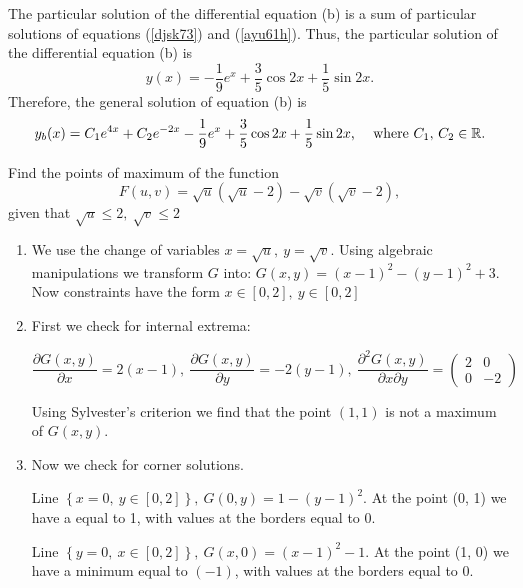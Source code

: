 \documentclass[addpoints, answers]{exam} %
\begin{document}
\begin{questions}
\begin{parts}
\begin{solution}
  The particular solution of the differential equation (b) is a sum of particular solutions of equations (\ref{djsk73}) and (\ref{ayu61h}). Thus, the particular solution of the differential equation (b) is
  \[
      y(x) = -\frac{1}{9} e^x + \frac{3}{5} \cos 2x + \frac{1}{5} \sin 2x \text{.}
  \]
  Therefore, the general solution of equation (b) is
  \[
      y_b(x) = {C_1}{e^{4x}} + {C_2}{e^{ - 2x}} -\frac{1}{9} e^x + \frac{3}{5} \cos 2x + \frac{1}{5} \sin 2x \text{, \quad where $C_1, \, C_2 \in \mathbb{R}$.}
  \]
\end{solution}


\end{parts}





\question[10] Find the points of maximum of the function
\[
F\left(u,v\right)=\sqrt{u}\left(\sqrt{u}-2\right)-\sqrt{v}\left(\sqrt{v}-2\right),
\]
given that  $\sqrt{u}\le 2,\ \sqrt{v}\le 2$


\begin{solution}
  \begin{enumerate}
  \item  We use the change of variables $x=\sqrt{u},\ y=\sqrt{v}$. Using algebraic manipulations we transform $G$ into: $G\left(x,y\right)={\left(x-1\right)}^2-{\left(y-1\right)}^2+3$. Now constraints have the form $x\in \left[0,2\right],\ y\in \left[0,2\right]$

  \item  First we check for internal extrema:

  \[\frac{\partial G\left(x,y\right)}{\partial x}=2\left(x-1\right),\ \frac{\partial G\left(x,y\right)}{\partial y}=-2\left(y-1\right),\ \frac{{\partial }^2G\left(x,y\right)}{\partial x\partial y}=\left( \begin{array}{cc}
  2 & 0 \\
  0 & -2 \end{array}
  \right)\]


Using Sylvester's criterion we find that the point $(1,1)$ is not a maximum of $G(x,y)$.

\item  Now we check for corner solutions.

Line $\left\{x=0,\ y\in \left[0,2\right]\right\},\ G\left(0,y\right)=1-{\left(y-1\right)}^2$. At the point (0, 1) we have a \textbf{} equal to 1, with values at the borders equal to $0$.

Line $\left\{y=0,\ x\in \left[0,2\right]\right\},\ G\left(x,0\right)={\left(x-1\right)}^2-1$. At the point (1, 0) we have a minimum equal to $(-1)$, with values at the borders equal to 0.


\end{enumerate}
\end{solution}
\end{questions}
\end{document}
